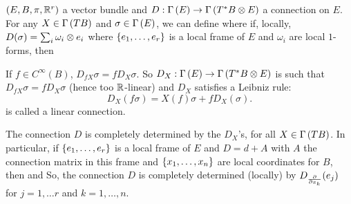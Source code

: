 \documentclass[main.tex]{subfiles}
\begin{document}
 $(E, B, \pi, \mathbb{R}^r)$ a vector bundle and $D: \Gamma\left( E \right) \to \Gamma\left( T^*B \otimes E \right)$ a connection on $E$. For any $X \in \Gamma\left( TB \right)$ and $\sigma \in \Gamma\left( E \right)$, we can define
where if, locally, $D(\sigma) = \sum_{i} \omega_i \otimes e_i$ where $\left\{e_1, \dots, e_r\right\}$ is a local frame of $E$ and $\omega_i$ are local $1$-forms, then 

\begin{note}
If $f \in C^\infty(B)$, $D_{fX}\sigma = fD_X\sigma$. So $D_X : \Gamma\left( E \right) \to \Gamma\left( T^*B \otimes E \right)$ is such that $D_{fX}\sigma = f D_X\sigma$ (hence too $\mathbb{R}$-linear) and $D_X$ satisfies a Leibniz rule:
\[
D_X(f\sigma) = X(f)\sigma + fD_X(\sigma).
\]
 is called a linear connection.
\end{note}

\begin{note}
The connection $D$ is completely determined by the $D_X$'s, for all $X \in \Gamma\left( TB \right)$. In particular, if $\left\{e_1, \dots, e_r\right\}$ is a local frame of $E$ and $D = d + A$ with $A$ the connection matrix in this frame and $\left\{x_1, \dots, x_n\right\}$ are local coordinates for $B$, then 
 and
So, the connection $D$ is completely determined (locally) by $D_{\frac{ \partial  }{ \partial x_k }}(e_j)$ for $j = 1, \dots r$ and $k = 1,\dots, n$.
\end{note}
\end{document}
